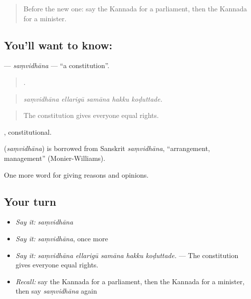 \label{lesson:KA-C393-samvidhana}



\begin{quote}
Before the new one: say the Kannada for a parliament, then the Kannada for a minister.
\end{quote}

\subsection*{You'll want to know: }
\textbf{} — \emph{saṃvidhāna} — \textquotedblleft{}a constitution\textquotedblright{}.

\begin{quote}
    .
\end{quote}

\begin{quote}
\emph{saṃvidhāna ellarigū samāna hakku koḍuttade.}
\end{quote}

\begin{quote}
The constitution gives everyone equal rights.
\end{quote}

, constitutional.

\begin{cousinweb}
\textbf{} (\emph{saṃvidhāna}) is borrowed from Sanskrit \emph{saṃvidhāna}, \textquotedblleft{}arrangement, management\textquotedblright{} (Monier-Williams).
\end{cousinweb}

\begin{grammarlens}[title={What you've built}]
One more word for giving reasons and opinions.
\end{grammarlens}

\subsection*{Your turn}
\begin{itemize}
\raggedright
  \item \emph{Say it:} \emph{saṃvidhāna}
  \item \emph{Say it:} \emph{saṃvidhāna}, once more
  \item \emph{Say it:} \emph{saṃvidhāna ellarigū samāna hakku koḍuttade.} — The constitution gives everyone equal rights.
  \item \emph{Recall:} say the Kannada for a parliament, then the Kannada for a minister, then say \emph{saṃvidhāna} again
\end{itemize}

